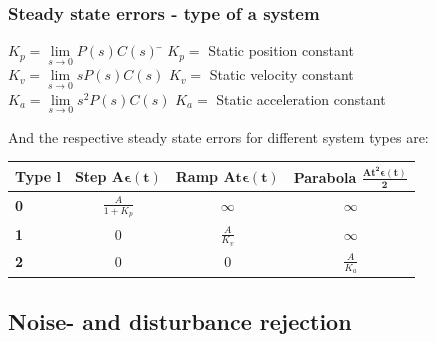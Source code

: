 \begin{frame}
	\frametitle{Steady state errors - type of a system}
	\begin{block}{}
			\begin{tabbing}
			$K_p = \lim\limits_{s \rightarrow 0} P(s)C(s)$ 
			\hspace{2em} \= $K_p = $ Static position constant \\
			$K_v = \lim\limits_{s \rightarrow 0}s P(s)C(s)$ \> $K_v = $ Static velocity constant \\
			$K_a = \lim\limits_{s \rightarrow 0}s^2 P(s)C(s)$ \> $K_a = $ Static acceleration constant
			\end{tabbing}
		\end{block}
	\begin{alertblock}{}
		And the respective steady state errors for different system types are:
		\begin{tabular}{|l|c|c|c|}
			\hline \textbf{Type} $\mathbf{l}$ & \textbf{Step} $\mathbf{A \boldsymbol{\epsilon} (t)}$ & \textbf{Ramp} $\mathbf{At \boldsymbol{\epsilon} (t)}$ & \textbf{Parabola} $\mathbf{\frac{At^2 \boldsymbol{\epsilon} (t)}{2}}$ \\ 
			\hline \textbf{0} & $\frac{A}{1 + K_p}$ & $\infty$ & $\infty$ \\ 
			\hline \textbf{1} & 0 & $\frac{A}{K_v}$ & $\infty$ \\ 
			\hline \textbf{2} & 0 & 0 & $\frac{A}{K_a}$ \\ 
			\hline 
		\end{tabular} 
	\end{alertblock}
\end{frame}


\subsection[Noise- and disturbance rejection]{Noise- and disturbance rejection}

